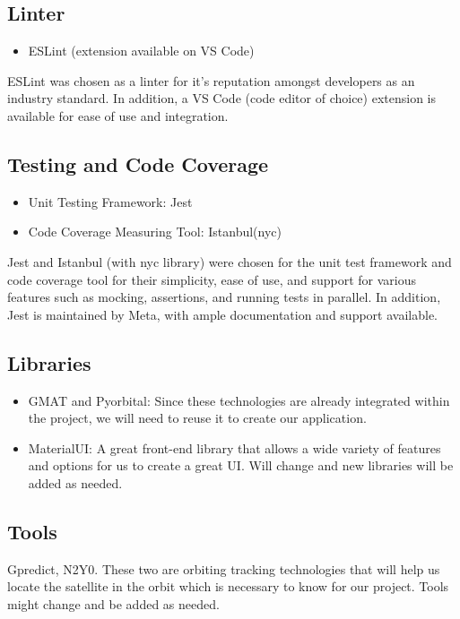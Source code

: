 \documentclass{article}
\begin{document}
\subsection{Linter}
\begin{itemize}
\item ESLint (extension available on VS Code)
\end{itemize}
ESLint was chosen as a linter for it’s reputation amongst developers as an industry standard. In addition, a VS Code (code editor of choice) extension is available for ease of use and integration.

\subsection{Testing and Code Coverage}
\begin{itemize}
\item Unit Testing Framework: Jest
\item Code Coverage Measuring Tool: Istanbul(nyc)
\end{itemize}
Jest and Istanbul (with nyc library) were chosen for the unit test framework and code coverage tool for their simplicity, ease of use, and support for various features such as mocking, assertions, and running tests in parallel. In addition, Jest is maintained by Meta, with ample documentation and support available.

\subsection{Libraries}
\begin{itemize}
    \item GMAT and Pyorbital: Since these technologies are already integrated within the project, we will need to reuse it to create our application.  
    \item MaterialUI: A great front-end library that allows a wide variety of features and options for us to create a great UI. Will change and new libraries will be added as needed. 
\end{itemize}

\subsection{Tools}
Gpredict, N2Y0. These two are orbiting
tracking technologies that will help us locate the satellite in the orbit
which is necessary to know for our project. Tools might change and be
added as needed.
\end{document}
